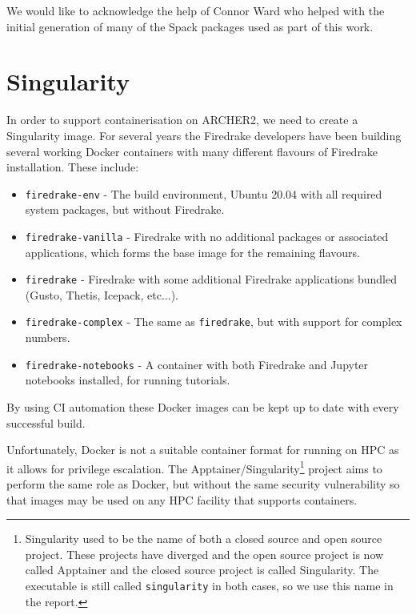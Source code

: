\documentclass[a4paper,11pt]{article}
\begin{document}
We would like to acknowledge the help of Connor Ward who helped with the initial generation of many of the Spack packages used as part of this work.


\section{Singularity}
\label{sec:singularity}
In order to support containerisation on ARCHER2, we need to create a Singularity image.
For several years the Firedrake developers have been building several working Docker containers with many different flavours of Firedrake installation.
These include:
\begin{itemize}[topsep=2pt, partopsep=0pt, itemsep=1pt, parsep=1pt]
	\item \verb`firedrake-env` - The build environment, Ubuntu 20.04 with all required system packages, but without Firedrake.
	\item \verb`firedrake-vanilla` - Firedrake with no additional packages or associated applications, which forms the base image for the remaining flavours.
	\item \verb`firedrake` - Firedrake with some additional Firedrake applications bundled (Gusto, Thetis, Icepack, etc...).
	\item \verb`firedrake-complex` - The same as \verb`firedrake`, but with support for complex numbers.
	\item \verb`firedrake-notebooks` - A container with both Firedrake and Jupyter notebooks installed, for running tutorials.
\end{itemize}    
By using CI automation these Docker images can be kept up to date with every successful build.

Unfortunately, Docker is not a suitable container format for running on HPC as it allows for privilege escalation.
The Apptainer/Singularity\footnote{Singularity used to be the name of both a closed source and open source project. These projects have diverged and the open source project is now called Apptainer and the closed source project is called Singularity. The executable is still called \texttt{singularity} in both cases, so we use this name in the report.} 
project aims to perform the same role as Docker, but without the same security vulnerability so that images may be used on any HPC facility that supports containers.
\end{document}
